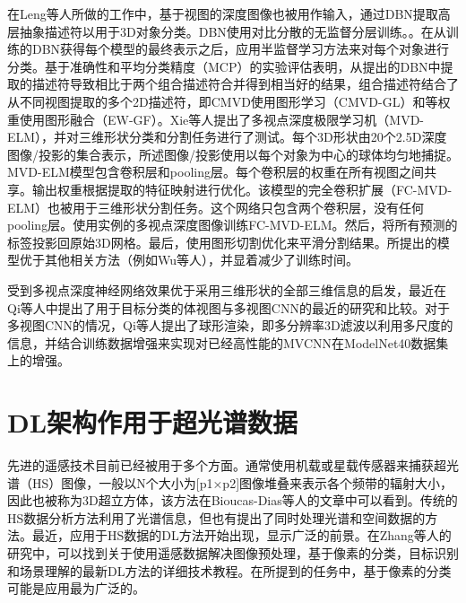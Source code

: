 在Leng等人\cite{Leng20143D}所做的工作中，基于视图的深度图像也被用作输入，通过DBN提取高层抽象描述符以用于3D对象分类。DBN使用对比分散的无监督分层训练。。在从训练的DBN获得每个模型的最终表示之后，应用半监督学习方法来对每个对象进行分类。基于准确性和平均分类精度（MCP）的实验评估表明，从提出的DBN中提取的描述符导致相比于两个组合描述符合并得到相当好的结果，组合描述符结合了从不同视图提取的多个2D描述符，即CMVD\cite{Daras2010A}使用图形学习（CMVD-GL）和等权重使用图形融合（EW-GF）。Xie等人\cite{Xie2015Projective}提出了多视点深度极限学习机（MVD-ELM），并对三维形状分类和分割任务进行了测试。每个3D形状由20个2.5D深度图像/投影的集合表示，所述图像/投影使用以每个对象为中心的球体均匀地捕捉。MVD-ELM模型包含卷积层和pooling层。每个卷积层的权重在所有视图之间共享。输出权重根据提取的特征映射进行优化。该模型的完全卷积扩展（FC-MVD-ELM）也被用于三维形状分割任务。这个网络只包含两个卷积层，没有任何pooling层。使用实例的多视点深度图像训练FC-MVD-ELM。然后，将所有预测的标签投影回原始3D网格。最后，使用图形切割优化来平滑分割结果。所提出的模型优于其他相关方法（例如Wu等人\cite{Wu20143D}），并显着减少了训练时间。

受到多视点深度神经网络效果优于采用三维形状的全部三维信息的启发，最近在Qi等人\cite{Qi2016Volumetric}中提出了用于目标分类的体视图与多视图CNN的最近的研究和比较。对于多视图CNN的情况，Qi等人提出了球形渲染，即多分辨率3D滤波以利用多尺度的信息，并结合训练数据增强来实现对已经高性能的MVCNN在ModelNet40数据集上的增强。


\section{DL架构作用于超光谱数据}

先进的遥感技术目前已经被用于多个方面。通常使用机载或星载传感器来捕获超光谱（HS）图像，一般以N个大小为[p1×p2]图像堆叠来表示各个频带的辐射大小，因此也被称为3D超立方体，该方法在Bioucas-Dias等人的文章中可以看到\cite{Bioucas2013Hyperspectral}。传统的HS数据分析方法利用了光谱信息，但也有提出了同时处理光谱和空间数据的方法。最近，应用于HS数据的DL方法开始出现，显示广泛的前景。在Zhang等人\cite{Zhang2016Deep}的研究中，可以找到关于使用遥感数据解决图像预处理，基于像素的分类，目标识别和场景理解的最新DL方法的详细技术教程。在所提到的任务中，基于像素的分类可能是应用最为广泛的。


